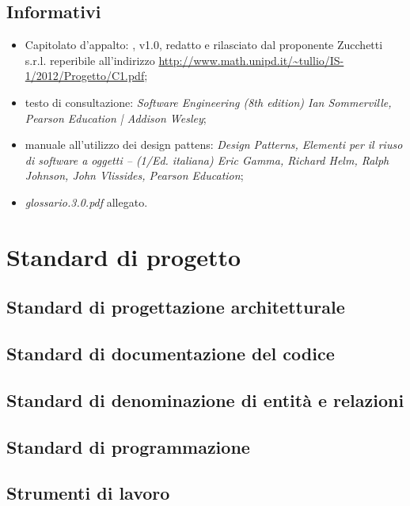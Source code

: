 \subsection{Informativi}
\begin{itemize}
\item[] Capitolato d'appalto: \caName{}, v1.0, redatto e rilasciato dal proponente Zucchetti s.r.l. reperibile all'indirizzo \url{http://www.math.unipd.it/~tullio/IS-1/2012/Progetto/C1.pdf};
\item[] testo di consultazione: \textit{Software Engineering (8th edition) Ian Sommerville, Pearson Education | Addison Wesley};
\item[] manuale all'utilizzo dei design pattens: \textit{Design Patterns, Elementi per il riuso di software a oggetti -- (1/Ed. italiana) Eric Gamma, Richard Helm, Ralph Johnson, John Vlissides, Pearson Education};
\item[] \textit{glossario.3.0.pdf} allegato.
\end{itemize}
\clearpage

\section{Standard di progetto}

\subsection{Standard di progettazione architetturale}

\subsection{Standard di documentazione del codice}

\subsection{Standard di denominazione di entità e relazioni}

\subsection{Standard di programmazione}

\subsection{Strumenti di lavoro}

